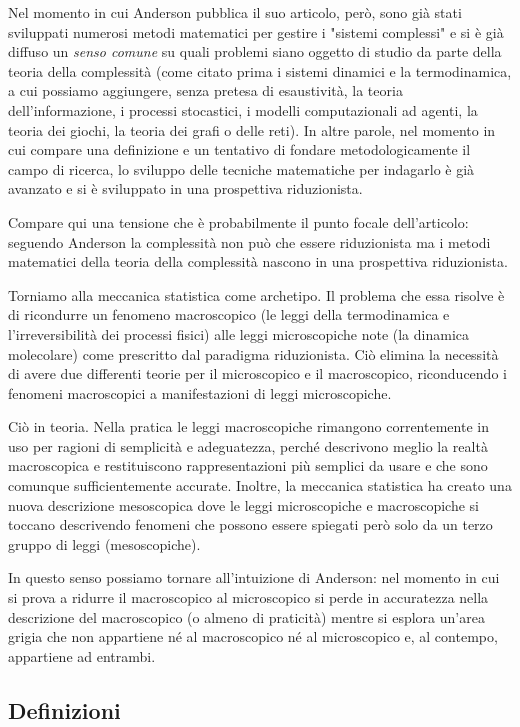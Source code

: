 \documentclass[a4paper, headings=standardclasses]{scrartcl}
\begin{document}
Nel momento in cui Anderson pubblica il suo articolo, però, sono già stati sviluppati numerosi metodi matematici per gestire i "sistemi complessi" e si è già diffuso un \textit{senso comune} su quali problemi siano oggetto di studio da parte della teoria della complessità (come citato prima i sistemi dinamici e la termodinamica, a cui possiamo aggiungere, senza pretesa di esaustività, la teoria dell'informazione, i processi stocastici, i modelli computazionali ad agenti, la teoria dei giochi, la teoria dei grafi o delle reti). In altre parole, nel momento in cui compare una definizione e un tentativo di fondare metodologicamente il campo di ricerca, lo sviluppo delle tecniche matematiche per indagarlo è già avanzato e si è sviluppato in una prospettiva riduzionista.

Compare qui una tensione che è probabilmente il punto focale dell'articolo: seguendo Anderson la complessità non può che essere riduzionista ma i metodi matematici della teoria della complessità nascono in una prospettiva riduzionista.

Torniamo alla meccanica statistica come archetipo. Il problema che essa risolve è di ricondurre un fenomeno macroscopico (le leggi della termodinamica e l'irreversibilità dei processi fisici) alle leggi microscopiche note (la dinamica molecolare) come prescritto dal paradigma riduzionista.  Ciò elimina la necessità di avere due differenti teorie per il microscopico e il macroscopico, riconducendo i fenomeni macroscopici a manifestazioni di leggi microscopiche.

Ciò in teoria. Nella pratica le leggi macroscopiche rimangono correntemente in uso per ragioni di semplicità e adeguatezza, perché descrivono meglio la realtà macroscopica e restituiscono rappresentazioni più semplici da usare e che sono comunque sufficientemente accurate. Inoltre, la meccanica statistica ha creato una nuova descrizione mesoscopica dove le leggi microscopiche e macroscopiche si toccano descrivendo fenomeni che possono essere spiegati però solo da un terzo gruppo di leggi (mesoscopiche).

In questo senso possiamo tornare all'intuizione di Anderson: nel momento in cui si prova a ridurre il macroscopico al microscopico si perde in accuratezza nella descrizione del macroscopico (o almeno di praticità) mentre si esplora un'area grigia che non appartiene né al macroscopico né al microscopico e, al contempo, appartiene ad entrambi.

\subsection{Definizioni}
\end{document}
